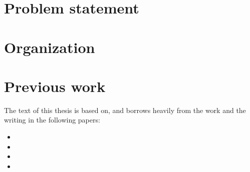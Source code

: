 
\section{Problem statement}

\section{Organization}

\section{Previous work}

The text of this thesis is based on, and borrows heavily from the work and the
writing in the following papers:

\begin{itemize}
\item {}
\item {}
\item {}
\item {}
\end{itemize}
